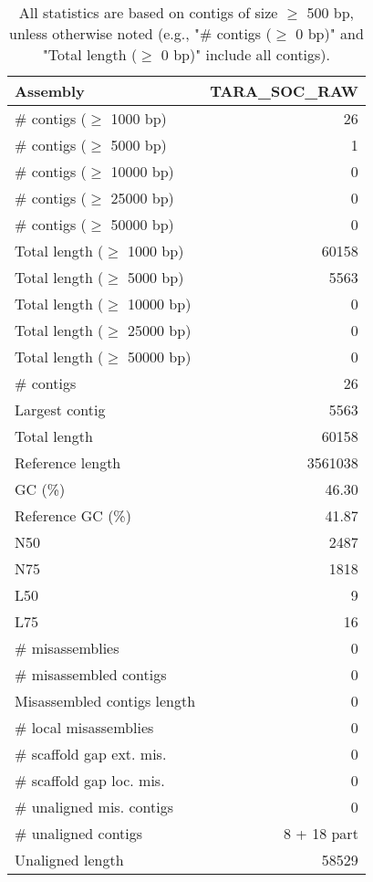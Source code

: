 \documentclass[12pt,a4paper]{article}
\begin{document}
\begin{table}[ht]
\begin{center}
\caption{All statistics are based on contigs of size $\geq$ 500 bp, unless otherwise noted (e.g., "\# contigs ($\geq$ 0 bp)" and "Total length ($\geq$ 0 bp)" include all contigs).}
\begin{tabular}{|l*{1}{|r}|}
\hline
Assembly & TARA\_SOC\_RAW \\ \hline
\# contigs ($\geq$ 1000 bp) & 26 \\ \hline
\# contigs ($\geq$ 5000 bp) & 1 \\ \hline
\# contigs ($\geq$ 10000 bp) & 0 \\ \hline
\# contigs ($\geq$ 25000 bp) & 0 \\ \hline
\# contigs ($\geq$ 50000 bp) & 0 \\ \hline
Total length ($\geq$ 1000 bp) & 60158 \\ \hline
Total length ($\geq$ 5000 bp) & 5563 \\ \hline
Total length ($\geq$ 10000 bp) & 0 \\ \hline
Total length ($\geq$ 25000 bp) & 0 \\ \hline
Total length ($\geq$ 50000 bp) & 0 \\ \hline
\# contigs & 26 \\ \hline
Largest contig & 5563 \\ \hline
Total length & 60158 \\ \hline
Reference length & 3561038 \\ \hline
GC (\%) & 46.30 \\ \hline
Reference GC (\%) & 41.87 \\ \hline
N50 & 2487 \\ \hline
N75 & 1818 \\ \hline
L50 & 9 \\ \hline
L75 & 16 \\ \hline
\# misassemblies & 0 \\ \hline
\# misassembled contigs & 0 \\ \hline
Misassembled contigs length & 0 \\ \hline
\# local misassemblies & 0 \\ \hline
\# scaffold gap ext. mis. & 0 \\ \hline
\# scaffold gap loc. mis. & 0 \\ \hline
\# unaligned mis. contigs & 0 \\ \hline
\# unaligned contigs & 8 + 18 part \\ \hline
Unaligned length & 58529 \\ \hline

\end{tabular}
\end{center}
\end{table}
\end{document}
